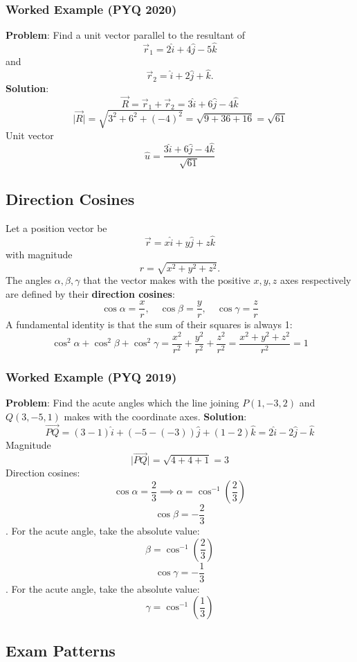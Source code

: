 \documentclass[
]{article}
\begin{document}
\subsubsection{Worked Example (PYQ 2020)}\label{worked-example-pyq-2020}

\textbf{Problem}: Find a unit vector parallel to the resultant of
\[
\vec{r}_1 = 2\hat{i} + 4\hat{j} - 5\hat{k}
\]
and
\[
\vec{r}_2 = \hat{i} + 2\hat{j} + \hat{k}.
\]
\textbf{Solution}:
\[
\vec{R} = \vec{r}_1 + \vec{r}_2 = 3\hat{i} + 6\hat{j} - 4\hat{k}
\]
\[
\lvert \vec{R} \rvert = \sqrt{3^2 + 6^2 + (-4)^2} = \sqrt{9 + 36 + 16} = \sqrt{61}
\]
Unit vector
\[
\hat{u} = \frac{3\hat{i} + 6\hat{j} - 4\hat{k}}{\sqrt{61}}
\]

\subsection{Direction Cosines}\label{direction-cosines}

Let a position vector be
\[
\vec{r} = x\hat{i} + y\hat{j} + z\hat{k}
\]
with magnitude
\[
r = \sqrt{x^2 + y^2 + z^2}.
\]
The angles \(\alpha, \beta, \gamma\) that the vector makes with the
positive \(x, y, z\) axes respectively are defined by their
\textbf{direction cosines}:
\[
\cos\alpha = \frac{x}{r}, \quad \cos\beta = \frac{y}{r}, \quad \cos\gamma = \frac{z}{r}
\]
A fundamental identity is that the sum of their squares is always 1:
\[
\cos^2\alpha + \cos^2\beta + \cos^2\gamma = \frac{x^2}{r^2} + \frac{y^2}{r^2} + \frac{z^2}{r^2} = \frac{x^2 + y^2 + z^2}{r^2} = 1
\]
\subsubsection{Worked Example (PYQ 2019)}\label{worked-example-pyq-2019}

\textbf{Problem}: Find the acute angles which the line joining
\(P(1, -3, 2)\) and \(Q(3, -5, 1)\) makes with the coordinate axes.
\textbf{Solution}:
\[
\vec{PQ} = (3 - 1)\hat{i} + (-5 - (-3))\hat{j} + (1 - 2)\hat{k} = 2\hat{i} - 2\hat{j} - \hat{k}
\]
Magnitude
\[
\lvert \vec{PQ} \rvert = \sqrt{4 + 4 + 1} = 3
\]
Direction cosines:
\[
\cos\alpha = \frac{2}{3} \implies \alpha = \cos^{-1}\left(\frac{2}{3}\right)
\]
\[
\cos\beta = -\frac{2}{3}
\]
. For the acute angle, take the absolute value:
\[
\beta = \cos^{-1}\left(\frac{2}{3}\right)
\]
\[
\cos\gamma = -\frac{1}{3}
\]
. For the acute angle, take the absolute value:
\[
\gamma = \cos^{-1}\left(\frac{1}{3}\right)
\]

\subsection{Exam Patterns}\label{exam-patterns}
\end{document}
